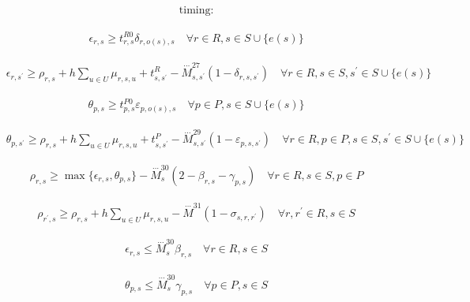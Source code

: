 \documentclass[10pt]{article}
\begin{document}
\[\begin{aligned}&\text{timing:}\end{aligned}\]

\[\begin{aligned}& \epsilon_{r, s} \ge t^{R0}_{r, s} \delta_{r, o(s), s} \quad \forall r \in R, s \in S \cup \{e(s)\}\end{aligned}\]

\[\begin{aligned}& \epsilon_{r, s^{\prime}} \ge \rho_{r, s} + h \sum_{u \in U} \mu_{r, s, u} + t^R_{s, s^{\prime}} - \overset{\cdots}{M}^{27}_{s, s^{\prime}}(1 - \delta_{r, s, s^{\prime}}) \quad \forall r \in R, s \in S, s^{\prime} \in S \cup \{e(s)\}\end{aligned}\]

\[\begin{aligned}& \theta_{p, s} \ge t^{P0}_{p, s} \varepsilon_{p, o(s), s} \quad \forall p \in P, s \in S \cup \{e(s)\}\end{aligned}\]

\[\begin{aligned}& \theta_{p, s^{\prime}} \ge \rho_{r, s} + h \sum_{u \in U} \mu_{r, s, u} + t^P_{s, s^{\prime}} - \overset{\cdots}{M}^{29}_{s, s^{\prime}}(1 - \varepsilon_{p, s, s^{\prime}}) \quad \forall r \in R, p \in P, s \in S, s^{\prime} \in S \cup \{e(s)\}\end{aligned}\]

\[\begin{aligned}& \rho_{r, s} \ge \max\{\epsilon_{r, s}, \theta_{p, s}\} - \overset{\cdots}{M}^{30}_s (2 - \beta_{r, s} - \gamma_{p, s}) \quad \forall r \in R, s \in S, p \in P\end{aligned}\]

\[\begin{aligned}& \rho_{r^{\prime}, s} \ge \rho_{r, s} + h \sum_{u \in U} \mu_{r, s, u} - \overset{\cdots}{M}^{31} (1 - \sigma_{s, r, r^{\prime}}) \quad \forall r, r^{\prime} \in R, s \in S\end{aligned}\]

\[\begin{aligned}& \epsilon_{r, s} \le \overset{\cdots}{M}^{30}_s \beta_{r, s} \quad \forall r \in R, s \in S\end{aligned}\]

\[\begin{aligned}& \theta_{p, s} \le \overset{\cdots}{M}^{30}_s \gamma_{p, s} \quad \forall p \in P, s \in S\end{aligned}\]
\end{document}
